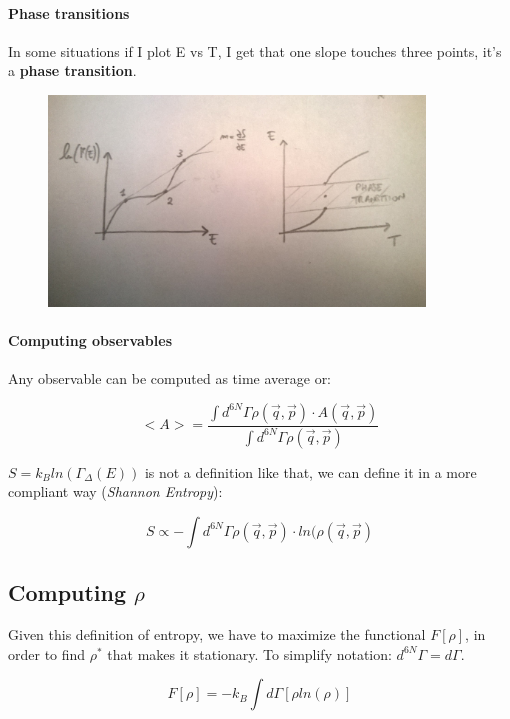 \documentclass[a4paper, italian, openany]{book}
\begin{document}
\paragraph{Phase transitions}

In some situations if I plot E vs T, I get that one slope touches three points, it's a \textbf{phase transition}.

\begin{figure}[H]
\centering
\includegraphics[width=100mm]{img/figure8.jpg}
\end{figure}

\paragraph{Computing observables}

Any observable can be computed as time average or:

$$<A> = \frac{\int d^{6N}\Gamma \rho(\overrightarrow{q}, \overrightarrow{p})\cdot A(\overrightarrow{q}, \overrightarrow{p})}{\int d^{6N}\Gamma \rho(\overrightarrow{q}, \overrightarrow{p})}$$

$S = k_B ln(\Gamma_\Delta (E))$ is not a definition like that, we can define it in a more compliant way (\textit{Shannon Entropy}):

$$S \propto - \int d^{6N} \Gamma \rho(\overrightarrow{q}, \overrightarrow{p}) \cdot ln( \rho(\overrightarrow{q}, \overrightarrow{p})$$

\subsection{Computing $\rho$}

Given this definition of entropy, we have to maximize the functional $F\left [ \rho \right ]$, in order to find $\rho^*$ that makes it stationary. To simplify notation: $d^{6N}\Gamma = d\Gamma$.

$$F \left [ \rho \right ] = -k_B \int d\Gamma \left [ \rho ln(\rho) \right ]$$
\end{document}
